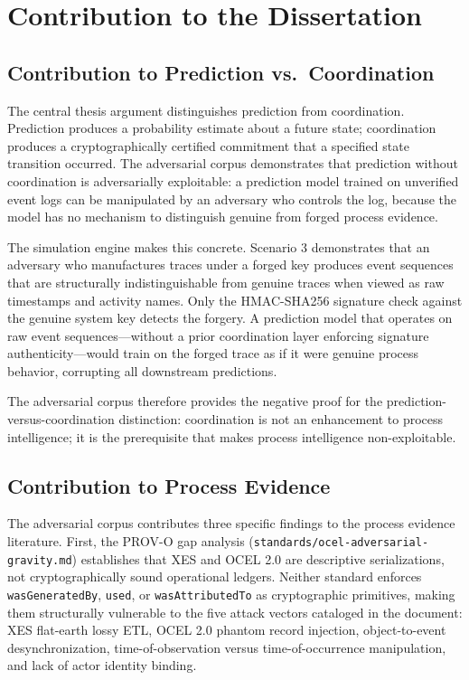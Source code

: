 
\section{Contribution to the Dissertation}
\label{sec:adversarial-contribution}

\subsection{Contribution to Prediction vs.~Coordination}
\label{sec:adversarial-contribution-prediction}

The central thesis argument distinguishes prediction from coordination. Prediction produces a
probability estimate about a future state; coordination produces a cryptographically certified
commitment that a specified state transition occurred. The adversarial corpus demonstrates
that prediction without coordination is adversarially exploitable: a prediction model trained
on unverified event logs can be manipulated by an adversary who controls the log, because the
model has no mechanism to distinguish genuine from forged process evidence.

The simulation engine makes this concrete. Scenario 3 demonstrates that an adversary who
manufactures traces under a forged key produces event sequences that are structurally
indistinguishable from genuine traces when viewed as raw timestamps and activity names. Only
the HMAC-SHA256 signature check against the genuine system key detects the forgery. A
prediction model that operates on raw event sequences---without a prior coordination layer
enforcing signature authenticity---would train on the forged trace as if it were genuine
process behavior, corrupting all downstream predictions.

The adversarial corpus therefore provides the negative proof for the prediction-versus-coordination
distinction: coordination is not an enhancement to process intelligence; it is the prerequisite
that makes process intelligence non-exploitable.

\subsection{Contribution to Process Evidence}
\label{sec:adversarial-contribution-evidence}

The adversarial corpus contributes three specific findings to the process evidence
literature. First, the PROV-O gap analysis (\texttt{standards/ocel-adversarial-gravity.md})
establishes that XES and OCEL 2.0 are descriptive serializations, not cryptographically sound
operational ledgers. Neither standard enforces \texttt{wasGeneratedBy}, \texttt{used}, or
\texttt{wasAttributedTo} as cryptographic primitives, making them structurally vulnerable to
the five attack vectors cataloged in the document: XES flat-earth lossy ETL, OCEL 2.0
phantom record injection, object-to-event desynchronization, time-of-observation versus
time-of-occurrence manipulation, and lack of actor identity binding.


